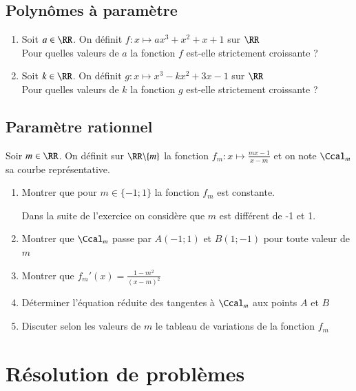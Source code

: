 \documentclass[oneside,12pt]{article}          %
\begin{document}
\subsection{Polynômes à paramètre}
\begin{enumerate}
	\item Soit $a\in\RR$. On définit $f:x\mapsto ax^3+x^2+x+1$ sur $\RR$ \\
	Pour quelles valeurs de $a$ la fonction $f$ est-elle strictement croissante ?
	
	\item Soit $k\in\RR$. On définit $g:x\mapsto x^3-kx^2+3x-1$ sur $\RR$ \\
	Pour quelles valeurs de $k$ la fonction $g$ est-elle strictement croissante ?
\end{enumerate}



\subsection{Paramètre rationnel}

Soir $m\in\RR$. On définit sur $\RR\backslash\{m\}$ la fonction $f_m:x\mapsto\frac{mx-1}{x-m}$ et on note $\Ccal_m$ sa courbe représentative.

\begin{enumerate}
	\item Montrer que pour $m\in\{-1;1\}$ la fonction $f_m$ est constante.
	
	Dans la suite de l'exercice on considère que $m$ est différent de -1 et 1.
	\item Montrer que $\Ccal_m$ passe par $A(-1;1)$ et $B(1;-1)$ pour toute valeur de $m$
	\item Montrer que $f_m'(x)=\frac{1-m^2}{(x-m)^2}$
	\item Déterminer l'équation réduite des tangentes à $\Ccal_m$ aux points $A$ et $B$
	\item Discuter selon les valeurs de $m$ le tableau de variations de la fonction $f_m$
\end{enumerate}



\section{Résolution de problèmes}
\end{document}
